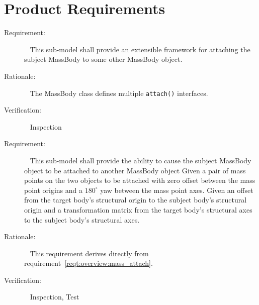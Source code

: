 %

\chapter{Product Requirements}\label{ch:\modelpartid:reqt}


\label{reqt:BodyAttach_Detach:attach_support}
\begin{description}
  \item[Requirement:]\ \newline
    This sub-model shall provide an extensible framework for attaching
    the subject MassBody to some other MassBody object.
  \item[Rationale:]\ \newline
    The MassBody class defines multiple {\tt attach()} interfaces.
  \item[Verification:]\ \newline
    Inspection
\end{description}

\label{reqt:BodyAttach_Detach:attach}
\begin{description}
  \item[Requirement:]\ \newline
    This sub-model shall provide the ability to cause the subject MassBody
    object to be attached to another MassBody object
    \label{reqt:BodyAttach_Detach:attach_point}
      Given a pair of mass points on the two objects to be attached with zero
      offset between the mass point origins and a $180^{\circ}$ yaw
      between the mass point axes.
    \label{reqt:BodyAttach_Detach:attach_matrix}
      Given an offset from the target body's structural origin to the
      subject body's structural origin and a transformation matrix from
      the target body's structural axes to the subject body's structural axes.
  \item[Rationale:]\ \newline
    This requirement derives directly from
    requirement~\ref{reqt:overview:mass_attach}.
  \item[Verification:]\ \newline
    Inspection, Test
\end{description}

